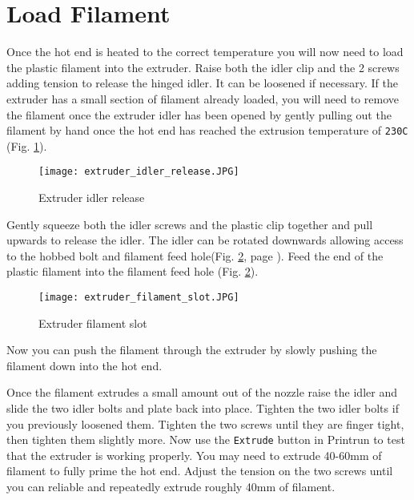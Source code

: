 \section{Load Filament}

Once the hot end is heated to the correct temperature you will now need to load the plastic filament into the extruder. Raise both the idler clip and the 2 screws adding tension to release the hinged idler. It can be loosened if necessary. If the extruder has a small section of filament already loaded, you will need to remove the filament once the extruder idler has been opened by gently pulling out the filament by hand once the hot end has reached the extrusion temperature of \texttt{230C}
(Fig. \ref{fig:extruder_idler_release}).
\begin{figure}[hbt]
\centering
\texttt{[image: extruder\_idler\_release.JPG]}
\caption{Extruder idler release}
\label{fig:extruder_idler_release}
\end{figure}
Gently squeeze both the idler screws and the plastic clip together and pull upwards to release the idler. The idler can be rotated downwards allowing access to the hobbed bolt and filament feed hole(Fig. \ref{fig:extruder_filament_slot}, page \pageref{fig:extruder_filament_slot}). Feed the end of the plastic filament into the filament feed hole
(Fig. \ref{fig:extruder_filament_slot}).
\begin{figure}[hbt]
\centering
\texttt{[image: extruder\_filament\_slot.JPG]}
\caption{Extruder filament slot}
\label{fig:extruder_filament_slot}
\end{figure}
Now you can push the filament through the extruder by slowly pushing the filament down into the hot end.

Once the filament extrudes a small amount out of the nozzle raise the idler and slide the two idler bolts and plate back into place. Tighten the two idler bolts if you previously loosened them. Tighten the two screws until they are finger tight, then tighten them slightly more. Now use the \texttt{Extrude} button in Printrun to test that the extruder is working properly. You may need to extrude 40-60mm of filament to fully prime the hot end. Adjust the tension on the two screws until you can reliable and repeatedly extrude roughly 40mm of filament.

